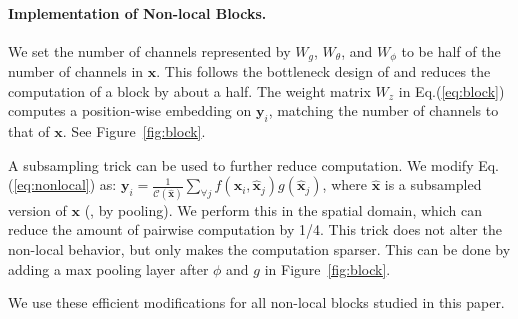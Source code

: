 \documentclass[10pt,twocolumn,letterpaper]{article}
\newcommand{\ve}[1]{\mathbf{#1}} %
\begin{document}
\paragraph{Implementation of Non-local Blocks.}
We set the number of channels represented by $W_g$, $W_\theta$, and $W_\phi$ to be half of the number of channels in $\ve{x}$. This follows the bottleneck design of \cite{He2016} and reduces the computation of a block by about a half. The weight matrix $W_z$ in Eq.(\ref{eq:block}) computes a position-wise embedding on $\ve{y}_i$, matching the number of channels to that of $\ve{x}$. See Figure~\ref{fig:block}.

A subsampling trick can be used to further reduce computation. We modify Eq.(\ref{eq:nonlocal}) as:  $\ve{y}_i = \frac{1}{\mathcal{C}(\ve{\hat{x}})} \sum_{\forall j}f(\ve{x}_i, \ve{\hat{x}}_j)g(\ve{\hat{x}}_j)$, where $\ve{\hat{x}}$ is a subsampled version of $\ve{x}$ (\eg, by pooling). We perform this in the spatial domain, which can reduce the amount of pairwise computation by 1/4. This trick does not alter the non-local behavior, but only makes the computation sparser. This can be done by adding a max pooling layer after $\phi$ and $g$ in Figure~\ref{fig:block}.

We use these efficient modifications for all non-local blocks studied in this paper.
\end{document}
